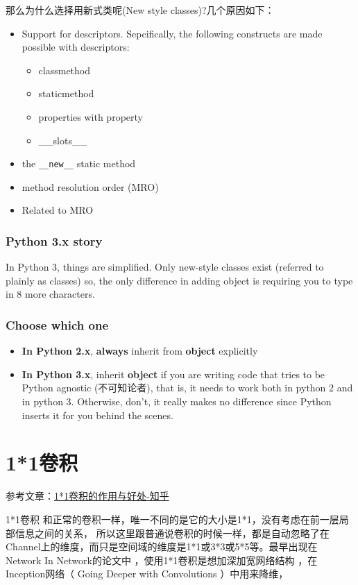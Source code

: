 那么为什么选择用新式类呢(New style classes)?几个原因如下：
\begin{itemize}
\item Support for descriptors. Sepcifically, the following constructs are made possible with descriptors:
\begin{itemize}
\item classmethod
\item staticmethod
\item properties with property
\item \_\_slots\_\_
\end{itemize}
\item the \verb|__new__| static method
\item method resolution order (MRO)
\item Related to MRO
\end{itemize}

\subsubsection{Python 3.x story}

In Python 3, things are simplified. Only new-style classes exist (referred to plainly as classes) so, the only difference in adding object is requiring you to type in 8 more characters. 


\subsubsection{Choose which one}

\begin{itemize}
\item \textbf{In Python 2.x}, \textbf{always} inherit from \textbf{object} explicitly
\item \textbf{In Python 3.x}, inherit \textbf{object} if you are writing code that tries to be Python agnostic (不可知论者), that is, it needs to work both in python 2 and in python 3. Otherwise, don't, it really makes no difference since Python inserts it for you behind the scenes.
\end{itemize}

\section{1*1卷积}

参考文章：\href{https://www.zhihu.com/question/56024942}{1*1卷积的作用与好处-知乎}

1*1卷积 和正常的卷积一样，唯一不同的是它的大小是1*1，没有考虑在前一层局部信息之间的关系， 所以这里跟普通说卷积的时候一样，都是自动忽略了在Channel上的维度，而只是空间域的维度是1*1或3*3或5*5等。最早出现在 Network In Network的论文中 ，使用1*1卷积是想加深加宽网络结构 ，在Inception网络（ Going Deeper with Convolutions ）中用来降维，

